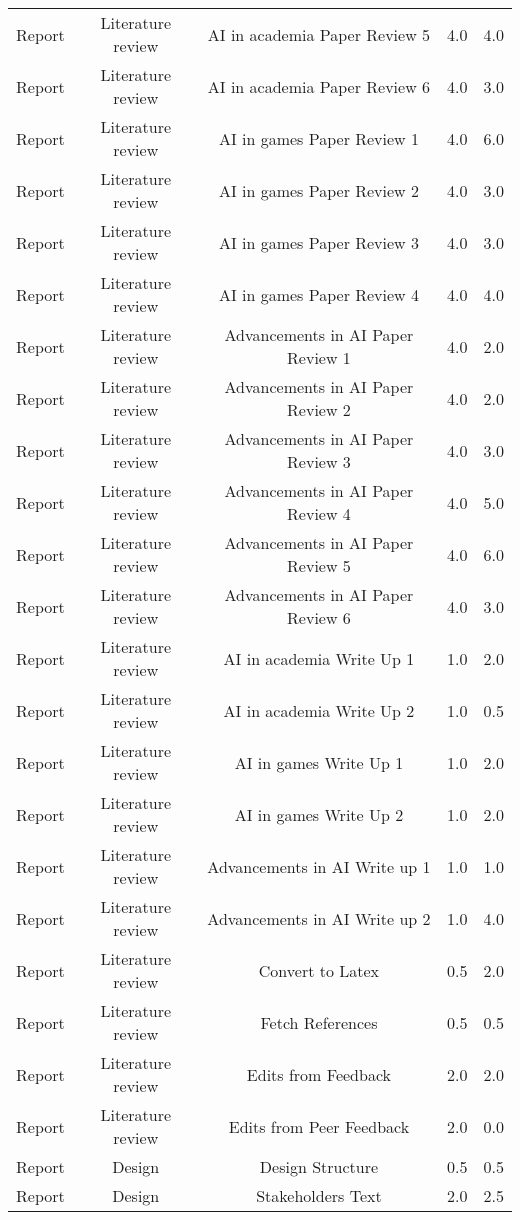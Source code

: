\begin{longtable}{|c|c|c|c|c|}
	Report & Literature review & AI in academia Paper Review 5 & 4.0 & 4.0 \\
	Report & Literature review & AI in academia Paper Review 6 & 4.0 & 3.0 \\
	Report & Literature review & AI in games Paper Review 1 & 4.0 & 6.0 \\
	Report & Literature review & AI in games Paper Review 2 & 4.0 & 3.0 \\
	Report & Literature review & AI in games Paper Review 3 & 4.0 & 3.0 \\
	Report & Literature review & AI in games Paper Review 4 & 4.0 & 4.0 \\
	Report & Literature review & Advancements in AI Paper Review 1 & 4.0 & 2.0 \\
	Report & Literature review & Advancements in AI Paper Review 2 & 4.0 & 2.0 \\
	Report & Literature review & Advancements in AI Paper Review 3 & 4.0 & 3.0 \\
	Report & Literature review & Advancements in AI Paper Review 4 & 4.0 & 5.0 \\
	Report & Literature review & Advancements in AI Paper Review 5 & 4.0 & 6.0 \\
	Report & Literature review & Advancements in AI Paper Review 6 & 4.0 & 3.0 \\
	Report & Literature review & AI in academia Write Up 1 & 1.0 & 2.0 \\
	Report & Literature review & AI in academia Write Up 2 & 1.0 & 0.5 \\
	Report & Literature review & AI in games Write Up 1 & 1.0 & 2.0 \\
	Report & Literature review & AI in games Write Up 2 & 1.0 & 2.0 \\
	Report & Literature review & Advancements in AI Write up 1 & 1.0 & 1.0 \\
	Report & Literature review & Advancements in AI Write up 2 & 1.0 & 4.0 \\
	Report & Literature review & Convert to Latex & 0.5 & 2.0 \\
	Report & Literature review & Fetch References & 0.5 & 0.5 \\
	Report & Literature review & Edits from Feedback & 2.0 & 2.0 \\
	Report & Literature review & Edits from Peer Feedback & 2.0 & 0.0 \\
	Report & Design & Design Structure & 0.5 & 0.5 \\
	Report & Design & Stakeholders Text & 2.0 & 2.5 \\

\end{longtable}
